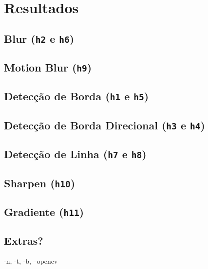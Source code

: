 \section{Resultados}

\subsection{Blur (\texttt{h2} e \texttt{h6})} \label{sec:blur}

    

\subsection{Motion Blur (\texttt{h9})} \label{sec:motion}

    

\subsection{Detecção de Borda (\texttt{h1} e \texttt{h5})} \label{sec:borda}

    

\subsection{Detecção de Borda Direcional (\texttt{h3} e \texttt{h4})} \label{sec:sobel}

    

\subsection{Detecção de Linha (\texttt{h7} e \texttt{h8})} \label{sec:linha}

    

\subsection{Sharpen (\texttt{h10})} \label{sec:sharpen}

    

\subsection{Gradiente (\texttt{h11})} \label{sec:grad}

    

\subsection{Extras?}

    -n, -t, -b, --opencv
